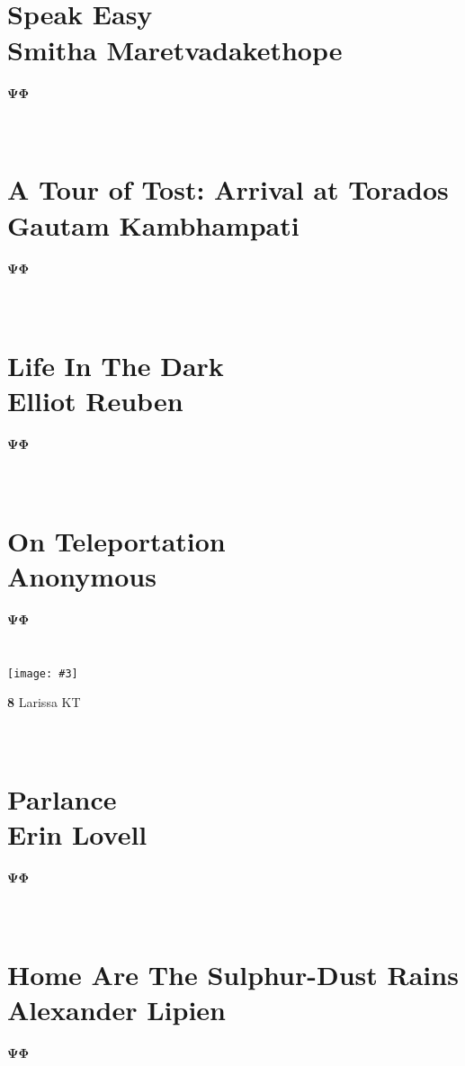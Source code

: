 \documentclass[a4paper,12pt]{article}
\makeatletter
\renewcommand{\tableofcontents}{%
  \@starttoc{toc}%
}
\newcommand{\tombstone}[0]{$\mathbf{\Psi\!\Phi}$}
\makeatother
\begin{document}
\tableofcontents
\vfill
\clearpage

\newcommand{\storyhead}[3]{
  \section[
    #1 \\{\normalfont {#2}}
    \\{\normalfont {\footnotesize \textit{#3}}}
  ]{
    \\[-0.5\baselineskip] {#1}
    \\[-0.2em] {\normalsize\normalfont #2}
  }
}
\newcommand{\story}[4]{
  \storyhead{#1}{#2}{#3}
  
  \tombstone
}

\newcommand{\artworkc}[3]{
  \begin{center}
    \texttt{[image: \#3]}
    \par
    \textbf{#1} \textendash{} {#2}
  \end{center}
}

\story{Speak Easy}{Smitha Maretvadakethope}{
  I was leaning against the bar in a speakeasy on 52nd Street \ldots
}{txt/maretvadakethope}
\clearpage

\story{ A Tour of Tost: Arrival at Torados}{Gautam Kambhampati }{
  Trading was done of necessity, for Tost had no resources beyond the
  ability to grow grain. }{txt/kambhampati}
\clearpage

\section[Microfiction Contest Winners]{}\vspace{-1.5\baselineskip}

\clearpage

\story{
  Life In The Dark}{Elliot Reuben
}{
  It goes dark, but a colourful kind of dark. I hear others \ldots
}{txt/reuben}
\clearpage

\story{
  On Teleportation}{Anonymous
}{
  Teleportation is a much less useful spell than it at first seems to be.
}{txt/anon}
\clearpage

\section[8 {\normalfont \textemdash{} {artwork by Larissa KT}}]{}
\vspace{-1.5\baselineskip}
\artworkc{8}{Larissa KT}{img/kt.jpg}
\clearpage

\story{
  Parlance}{Erin Lovell
}{
  There's an Old Earthen language, see, that has this saying about \ldots
}{txt/lovell}
\clearpage

\story{ Home Are The Sulphur-Dust Rains}{Alexander Lipien }{
  Calm before the storm doesn't fit, I don't think. Not here. Here's
  always storm.  }{txt/lipien}
\clearpage
\end{document}
